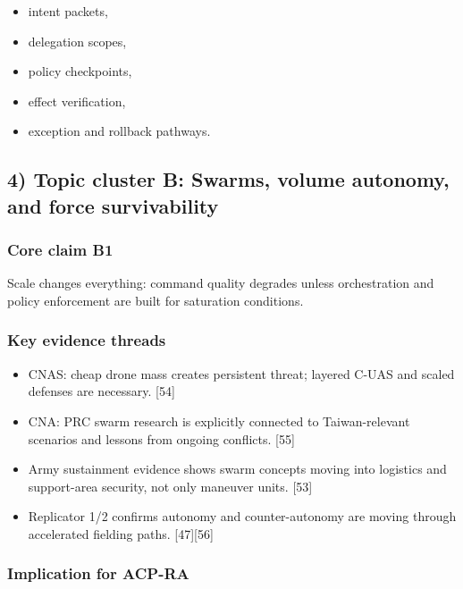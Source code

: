 \documentclass[11pt]{article}
\begin{document}
\begin{itemize}
\tightlist
\item
  intent packets,
\item
  delegation scopes,
\item
  policy checkpoints,
\item
  effect verification,
\item
  exception and rollback pathways.
\end{itemize}

\hypertarget{topic-cluster-b-swarms-volume-autonomy-and-force-survivability}{%
\subsection{4) Topic cluster B: Swarms, volume autonomy, and force
survivability}\label{topic-cluster-b-swarms-volume-autonomy-and-force-survivability}}

\hypertarget{core-claim-b1}{%
\subsubsection{Core claim B1}\label{core-claim-b1}}

Scale changes everything: command quality degrades unless orchestration
and policy enforcement are built for saturation conditions.

\hypertarget{key-evidence-threads-1}{%
\subsubsection{Key evidence threads}\label{key-evidence-threads-1}}

\begin{itemize}
\tightlist
\item
  CNAS: cheap drone mass creates persistent threat; layered C-UAS and
  scaled defenses are necessary. {[}54{]}
\item
  CNA: PRC swarm research is explicitly connected to Taiwan-relevant
  scenarios and lessons from ongoing conflicts. {[}55{]}
\item
  Army sustainment evidence shows swarm concepts moving into logistics
  and support-area security, not only maneuver units. {[}53{]}
\item
  Replicator 1/2 confirms autonomy and counter-autonomy are moving
  through accelerated fielding paths. {[}47{]}{[}56{]}
\end{itemize}

\hypertarget{implication-for-acp-ra-1}{%
\subsubsection{Implication for ACP-RA}\label{implication-for-acp-ra-1}}
\end{document}
